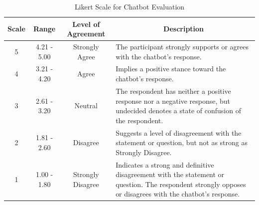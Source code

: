 \begin{refsection}
\begin{table}[H]
    \centering
    \caption{Likert Scale for Chatbot Evaluation}
    \label{tab:likert_scale}
    \begin{tabular}{cccm{7cm}}
        \hline
        \textbf{Scale} & \textbf{Range} & \textbf{Level of Agreement} & \multicolumn{1}{c}{\textbf{Description}} \\
        \hline
                5 & 4.21 - 5.00 & Strongly Agree & The participant strongly supports or agrees with the chatbot's response.\\
        \hline
                4 & 3.21 - 4.20 & Agree & Implies a positive stance toward the chatbot's response. \\
        \hline
                3 & 2.61 - 3.20 & Neutral & The respondent has neither a positive response nor a negative response, but undecided denotes a state of confusion of the respondent. \\
        \hline
                2 & 1.81 - 2.60 & Disagree & Suggests a level of disagreement with the statement or question, but not as strong as Strongly Disagree.\\
        \hline
                1 & 1.00 - 1.80 & Strongly Disagree & Indicates a strong and definitive disagreement with the statement or question. The respondent strongly opposes or disagrees with the chatbot's response.\\
        \hline
    \end{tabular}
\end{table}


\end{refsection}
